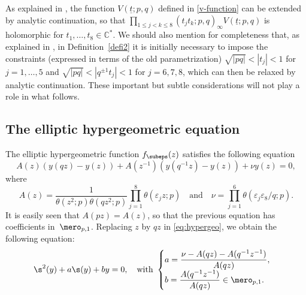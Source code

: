 \begin{remark}
As explained in \cite{spiridonov2016elliptic}, the function $V(\underline{t};p,q)$ defined in \eqref{v-function} can be extended by analytic continuation, so that $\prod_{1\leq j<k\leq 8}(t_jt_k;p,q)_\infty V(\underline{t};p,q)$ is holomorphic for $t_1,\dots,t_8\in\mathbb{C}^{*}$. We should also mention for completeness that, as explained in \cite{spiridonov2016elliptic}, in Definition~\ref{defi2} it is initially necessary to impose the constraints (expressed in terms of the old parametrization) $\sqrt{|pq|}<|t_j|<1$ for $j=1,\dots,5$ and $\sqrt{|pq|}<|q^{\pm 1}t_j|<1$ for $j=6,7,8$, which can then be relaxed by analytic continuation. These important but subtle considerations will not play a role in what follows.
\end{remark}

\subsection{The elliptic hypergeometric equation}

The elliptic hypergeometric function $f_{\subeps}(z)$ satisfies the following equation
\begin{equation}\label{eq:hypergeo}
A(z)(y(qz)-y(z))+A(z^{-1})(y(q^{-1}z)-y(z))+\nu y(z)=0,
\end{equation}
where
\begin{equation} \label{hypergeo-coefficients} A(z)=\frac{1}{\theta(z^{2};p)\theta(qz^{2};p)}
\prod_{j=1}^{8}\theta(\varepsilon_{j}z;p) \quad\text{and}\quad \nu= \prod_{j=1}^{6}\theta (\varepsilon_{j}\varepsilon_{8}/q;p).\end{equation}
It is easily seen that $A(pz)=A(z)$, so that the previous equation has coefficients in~$\mero_{p,1}$. Replacing $z$ by $qz$ in \eqref{eq:hypergeo}, we obtain the following equation:
\begin{equation}\label{eq:2hypergeo bis}
\s^{2}(y)+a\s (y)+by=0,\quad\text{with }\begin{cases}
a=\dfrac{\nu-A(qz)-A(q^{-1}z^{-1})}{A(qz)},\\
b=\dfrac{A(q^{-1}z^{-1})}{A(qz)}\in \mero_{p,1}.
\end{cases}
\end{equation}


